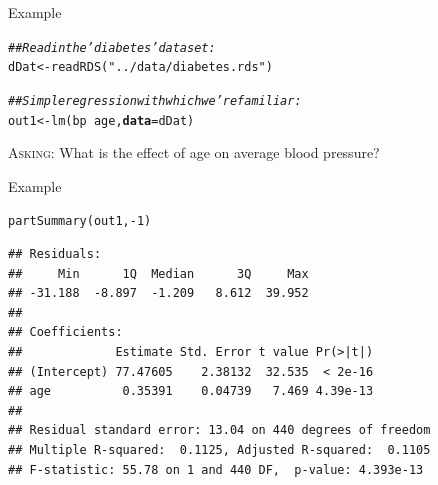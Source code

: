 \documentclass[10pt]{beamer}\usepackage[]{graphicx}\usepackage[]{color}
\makeatletter
\newcommand{\hlnum}[1]{\textcolor[rgb]{0.69,0.494,0}{#1}}%
\newcommand{\hlstr}[1]{\textcolor[rgb]{0.749,0.012,0.012}{#1}}%
\newcommand{\hlcom}[1]{\textcolor[rgb]{0.514,0.506,0.514}{\textit{#1}}}%
\newcommand{\hlopt}[1]{\textcolor[rgb]{0,0,0}{#1}}%
\newcommand{\hlstd}[1]{\textcolor[rgb]{0,0,0}{#1}}%
\newcommand{\hlkwb}[1]{\textcolor[rgb]{0,0.341,0.682}{#1}}%
\newcommand{\hlkwc}[1]{\textcolor[rgb]{0,0,0}{\textbf{#1}}}%
\newcommand{\hlkwd}[1]{\textcolor[rgb]{0.004,0.004,0.506}{#1}}%
\newenvironment{kframe}{%
 \def\at@end@of@kframe{}%
 \ifinner\ifhmode%
  \def\at@end@of@kframe{\end{minipage}}%
  \begin{minipage}{\columnwidth}%
 \fi\fi%
 \def\FrameCommand##1{\hskip\@totalleftmargin \hskip-\fboxsep
 \colorbox{shadecolor}{##1}\hskip-\fboxsep
     \hskip-\linewidth \hskip-\@totalleftmargin \hskip\columnwidth}%
 \MakeFramed {\advance\hsize-\width
   \@totalleftmargin\z@ \linewidth\hsize
   \@setminipage}}%
 {\par\unskip\endMakeFramed%
 \at@end@of@kframe}
\newenvironment{knitrout}{}{} %
\makeatother
\begin{document}
\begin{frame}[fragile]{Example}

\begin{knitrout}\footnotesize
{}\color{fgcolor}\begin{kframe}
\begin{alltt}
\hlcom{## Read in the 'diabetes' dataset:}
\hlstd{dDat} \hlkwb{<-} \hlkwd{readRDS}\hlstd{(}\hlstr{"../data/diabetes.rds"}\hlstd{)}

\hlcom{## Simple regression with which we're familiar:}
\hlstd{out1} \hlkwb{<-} \hlkwd{lm}\hlstd{(bp} \hlopt{~} \hlstd{age,} \hlkwc{data} \hlstd{= dDat)}
\end{alltt}
\end{kframe}
\end{knitrout}

\va

\textsc{Asking}: What is the effect of age on average blood pressure?

\end{frame}

\watermarkoff %

\begin{frame}{Example}

\begin{knitrout}\footnotesize
{}\color{fgcolor}\begin{kframe}
\begin{alltt}
\hlkwd{partSummary}\hlstd{(out1,} \hlopt{-}\hlnum{1}\hlstd{)}
\end{alltt}
\begin{verbatim}
## Residuals:
##     Min      1Q  Median      3Q     Max 
## -31.188  -8.897  -1.209   8.612  39.952 
## 
## Coefficients:
##             Estimate Std. Error t value Pr(>|t|)
## (Intercept) 77.47605    2.38132  32.535  < 2e-16
## age          0.35391    0.04739   7.469 4.39e-13
## 
## Residual standard error: 13.04 on 440 degrees of freedom
## Multiple R-squared:  0.1125,	Adjusted R-squared:  0.1105 
## F-statistic: 55.78 on 1 and 440 DF,  p-value: 4.393e-13
\end{verbatim}
\end{kframe}
\end{knitrout}

\end{frame}

\watermarkon %
\end{document}
